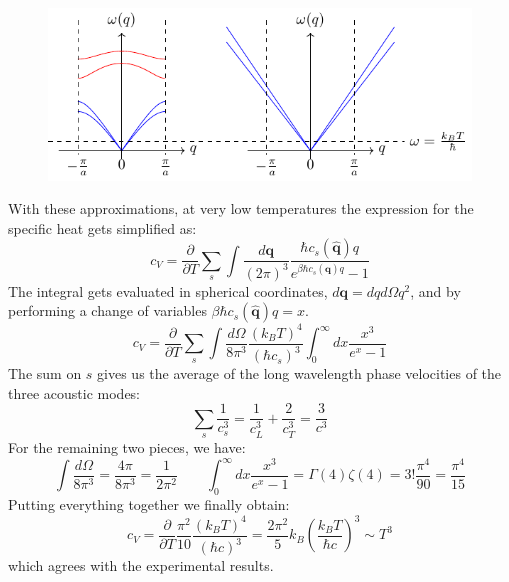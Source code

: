 \documentclass[10.75pt,a4paper,openright,bottom=2cm]{article}
\renewcommand{\Vec}[1]{\boldsymbol{#1}}
\begin{document}
\begin{figure}[h]
    \centering
    \includegraphics{simplifications.pdf}
    \label{fig:simplifications}
\end{figure}
With these approximations, at very low temperatures the expression for the specific heat gets simplified as:
\[
c_V=\frac{\partial}{\partial T}\sum_s\int\frac{d\Vec{q}}{(2\pi)^3}\frac{\hbar c_s(\hat{\Vec{q}})q}{e^{\beta\hbar c_s(\hat{\Vec{q}})q}-1}
\]
The integral gets evaluated in spherical coordinates, $d\Vec{q}=dqd\Omega q^2$, and by performing a change of variables $\beta\hbar c_s(\hat{\Vec{q}})q=x$.
\[
c_V=\frac{\partial}{\partial T}\sum_s\int\frac{d\Omega}{8\pi^3}\frac{(k_BT)^4}{(\hbar c_s)^3}\int_0^\infty dx\frac{x^3}{e^x-1}
\]
The sum on $s$ gives us the average of the long wavelength phase velocities of the three acoustic modes:
\[
\sum_s\frac{1}{c_s^3}=\frac{1}{c_L^3}+\frac{2}{c_T^3}=\frac{3}{c^3}
\]
For the remaining two pieces, we have:
\[
\int\frac{d\Omega}{8\pi^3}=\frac{4\pi}{8\pi^3}=\frac{1}{2\pi^2} \qquad \int_0^\infty dx\frac{x^3}{e^x-1}=\Gamma(4)\zeta(4)=3!\frac{\pi^4}{90}=\frac{\pi^4}{15}
\]
Putting everything together we finally obtain:
\[
c_V=\frac{\partial}{\partial T}\frac{\pi^2}{10}\frac{(k_BT)^4}{(\hbar c)^3}=\frac{2\pi^2}{5}k_B\left(\frac{k_BT}{\hbar c}\right)^3\sim T^3
\]
which agrees with the experimental results.
\end{document}
